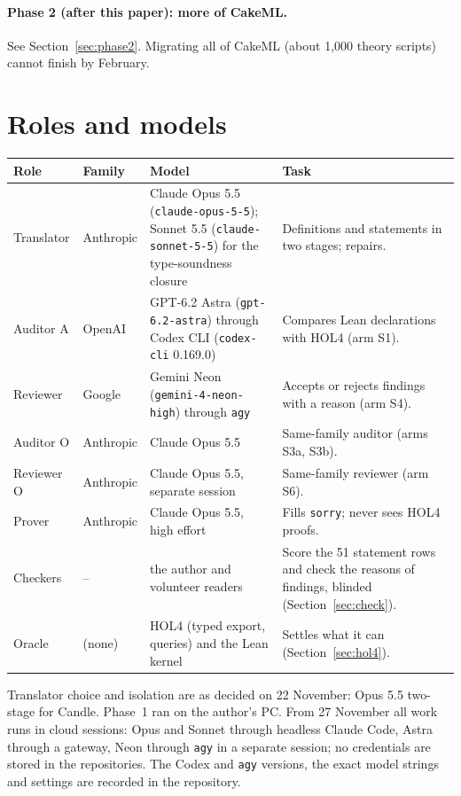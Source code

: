 \documentclass[11pt,a4paper]{article}
\newcommand{\code}[1]{\texttt{#1}}
\begin{document}
\paragraph{Phase 2 (after this paper): more of CakeML.} See Section~\ref{sec:phase2}. Migrating all of CakeML (about 1{,}000 theory scripts) cannot finish by February.

\section{Roles and models}
{\small\noindent
\begin{tabularx}{\textwidth}{@{}ll>{\raggedright\arraybackslash}X>{\raggedright\arraybackslash}X@{}}
\toprule
Role & Family & Model & Task\\
\midrule
Translator & Anthropic & Claude Opus 5.5 (\code{claude-opus-5-5}); Sonnet 5.5 (\code{claude-sonnet-5-5}) for the type-soundness closure & Definitions and statements in two stages; repairs.\\
Auditor A & OpenAI & GPT-6.2 Astra (\code{gpt-6.2-astra}) through Codex CLI (\code{codex-cli} 0.169.0) & Compares Lean declarations with HOL4 (arm S1).\\
Reviewer & Google & Gemini Neon (\code{gemini-4-neon-high}) through \code{agy} & Accepts or rejects findings with a reason (arm S4).\\
Auditor O & Anthropic & Claude Opus 5.5 & Same-family auditor (arms S3a, S3b).\\
Reviewer O & Anthropic & Claude Opus 5.5, separate session & Same-family reviewer (arm S6).\\
Prover & Anthropic & Claude Opus 5.5, high effort & Fills \code{sorry}; never sees HOL4 proofs.\\
Checkers & -- & the author and volunteer readers & Score the 51 statement rows and check the reasons of findings, blinded (Section~\ref{sec:check}).\\
Oracle & (none) & HOL4 (typed export, queries) and the Lean kernel & Settles what it can (Section~\ref{sec:hol4}).\\
\bottomrule
\end{tabularx}}

Translator choice and isolation are as decided on 22 November: Opus 5.5 two-stage for Candle. Phase~1 ran on the author's PC. From 27 November all work runs in cloud sessions: Opus and Sonnet through headless Claude Code, Astra through a gateway, Neon through \code{agy} in a separate session; no credentials are stored in the repositories. The Codex and \code{agy} versions, the exact model strings and settings are recorded in the repository.
\end{document}
